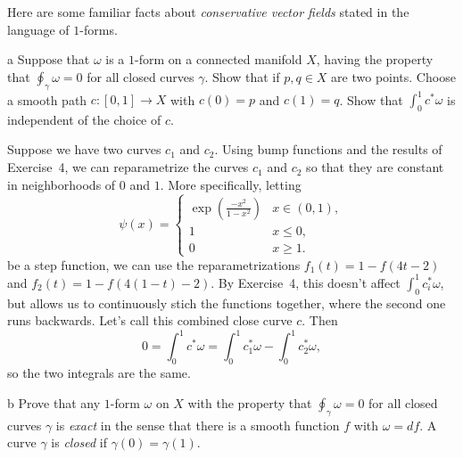 \documentclass[11pt,letterpaper]{article}
\begin{document}
\begin{solution}
    Here are some familiar facts about \emph{conservative vector fields} stated in the language of $1$-forms.
    \begin{partproblem}{a}%
        Suppose that $\omega$ is a $1$-form on a connected manifold $X$, having the property that $\oint_\gamma \omega = 0$ for all closed curves $\gamma$. Show that if $p,q\in X$ are two points. Choose a smooth path $c : [0,1] \to X$ with $c(0)=p$ and $c(1)=q$. Show that $\int^1_0 c^*\omega$ is independent of the choice of $c$.
    \end{partproblem}

    \quad Suppose we have two curves $c_1$ and $c_2$. Using bump functions and the results of Exercise~4, we can reparametrize the curves $c_1$ and $c_2$ so that they are constant in neighborhoods of $0$ and $1$. More specifically, letting
    \[
        \psi(x) = \begin{cases}
            \exp\left(\frac{-x^2}{1-x^2}\right)&x\in (0,1),\\
            1 & x\leq 0,\\
            0 & x \geq 1.
        \end{cases}
    \] 
    be a step function, we can use the reparametrizations $f_1(t) = 1-f(4t-2)$ and $f_2(t) = 1-f(4(1-t)-2)$. By Exercise~4, this doesn't affect $\int^1_0 c_i^*\omega$, but allows us to continuously stich the functions together, where the second one runs backwards. Let's call this combined close curve $c$. Then
    \[
        0=\int_0^1 c^*\omega=\int_0^1 c_1^*\omega - \int_0^1 c_2^*\omega,
    \] 
    so the two integrals are the same.

    \begin{partproblem}{b}%
        Prove that any $1$-form $\omega$ on $X$ with the property that $\oint_\gamma \omega = 0$ for all closed curves $\gamma$ is \emph{exact} in the sense that there is a smooth function $f$ with $\omega = df$. A curve $\gamma$ is \emph{closed} if $\gamma(0)=\gamma(1)$.
    \end{partproblem}


\end{solution}
\end{document}

